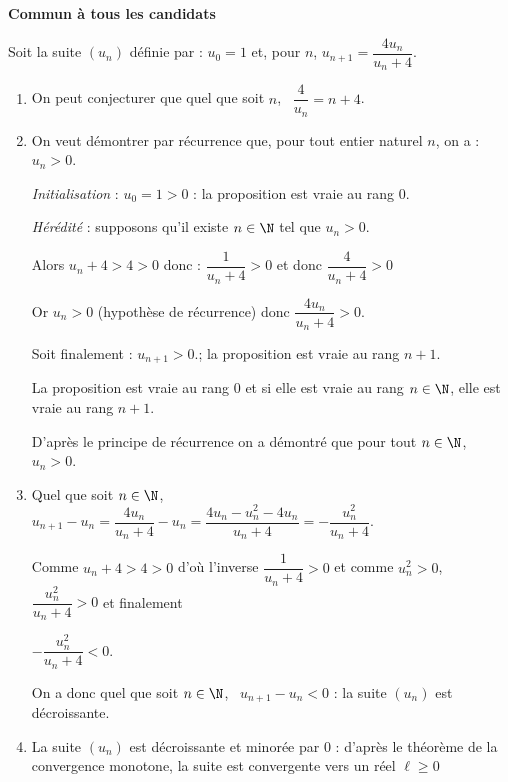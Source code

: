 \textbf{Commun à tous les candidats}

\medskip

Soit la suite $\left(u_n\right)$ définie par : $u_0 = 1$ et, pour $n$,
$ u_{n+1}  = \dfrac{4u_n}{u_n + 4}.$

\smallskip

\begin{enumerate}
\item


























On peut conjecturer que quel que soit $n$, \, $\dfrac{4}{u_n} = n + 4$.
\item On veut démontrer par récurrence que, pour tout entier naturel $n$, on a : $u_n > 0$.

\emph{Initialisation} : $u_0 = 1 > 0$ : la proposition est vraie au rang $0$.

\emph{Hérédité} : supposons qu'il existe $n \in \N$ tel que $u_n > 0$.

Alors $u_n + 4  >4 > 0$ donc : $ \dfrac{1}{u_n + 4} >0$ et donc $ \dfrac{4}{u_n + 4} >0$

Or $u_n>0$ (hypothèse de récurrence) donc $\dfrac{4u_n}{u_n + 4}>0$.

Soit finalement : $u_{n+1} >0$.; la proposition est vraie au rang $n + 1$.

La proposition est vraie au rang $0$ et si elle est vraie au rang $n \in \N$, elle est vraie au rang $n + 1$.

D'après le principe de récurrence on a démontré que pour tout $n \in \N$, \, $u_n > 0$.
\item 
Quel que soit $n \in \N$, \, $u_{n+1} - u_n = \dfrac{4u_n}{u_n + 4} - u_n = \dfrac{4u_n - u_n^2 - 4u_n}{u_n + 4} = - \dfrac{u_n^2}{u_n + 4}$.

Comme $u_n + 4 > 4 > 0$ d'où l'inverse $\dfrac{1}{u_n + 4} > 0$ et comme $u_n^2 > 0$, $\dfrac{u_n^2}{u_n + 4} > 0$ et finalement 

$- \dfrac{u_n^2}{u_n + 4} < 0$.

On a donc quel que soit $n \in \N$, \, $u_{n+1} - u_n < 0$ : la suite $\left(u_n\right)$ est décroissante.
\item 
La suite $\left(u_n\right)$ est décroissante et minorée par $0$ : d'après le théorème de la convergence monotone, la suite est convergente vers un réel $\ell \geqslant 0$


\end{enumerate}
